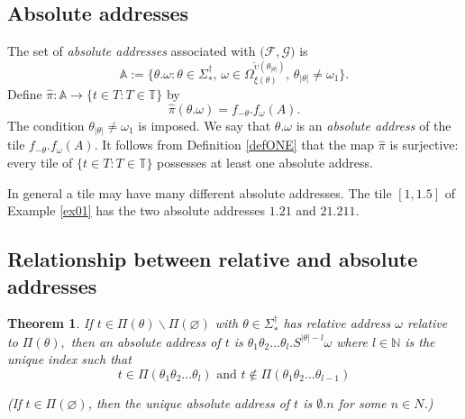 \documentclass{amsproc}
\newtheorem{theorem}{Theorem}
\theoremstyle{plain}
\theoremstyle{definition}
\numberwithin{equation}{section}
\begin{document}
\subsection{Absolute addresses}

The set of \textit{absolute addresses} associated with $(\mathcal{F},%
\mathcal{G)}$ is 
\begin{equation*}
\mathbb{A}:=\{\theta.\omega:\theta\in\Sigma_{\ast}^{\dag},\,\omega\in
\Omega_{\xi(\theta)}^{\overleftarrow{\upsilon}(\theta_{\left\vert
\theta\right\vert })},\,\theta_{\left\vert \theta\right\vert }\neq\omega
_{1}\}.
\end{equation*}
Define $\widehat{\pi}:\mathbb{A\rightarrow\{}t\in T:T\in\mathbb{T\}}$ by 
\begin{equation*}
\widehat{\pi}(\theta.\omega)=f_{-\theta}.f_{\omega}(A).
\end{equation*}
The condition $\theta_{\left\vert \theta\right\vert }\neq\omega_{1}$ is
imposed. We say that $\theta.\omega$ is an \textit{absolute address} of the
tile $f_{-\theta}.f_{\omega}(A)$. It follows from Definition \ref{defONE}
that the map $\widehat{\pi}$ is surjective: every tile of $\mathbb{\{}t\in
T:T\in\mathbb{T\}}$ possesses at least one absolute address.

In general a tile may have many different absolute addresses. The tile $%
[1,1.5]$ of Example \ref{ex01} has the two absolute addresses $1.21$ and $%
21.211$.

\subsection{Relationship between relative and absolute addresses}

\begin{theorem}
If $t\in\Pi(\theta)\backslash\Pi(\varnothing)$ with $\theta\in\Sigma_{\ast
}^{\dag}$ has relative address $\omega$ relative to $\Pi(\theta),$ then an
absolute address of $t$ is $\theta_{1}\theta_{2}...\theta_{l}.S^{\left\vert
\theta\right\vert -l}\omega$ where $l\in\mathbb{N}$ is the unique index such
that 
\begin{equation}
t\in\Pi(\theta_{1}\theta_{2}...\theta_{l})\text{ and }t\notin\Pi(\theta
_{1}\theta_{2}...\theta_{l-1})  \label{*eqn}
\end{equation}

(If $t\in\Pi(\varnothing)$, then the unique absolute address of $t$ is $%
\emptyset.n$ for some $n\in N$.)
\end{theorem}
\end{document}
